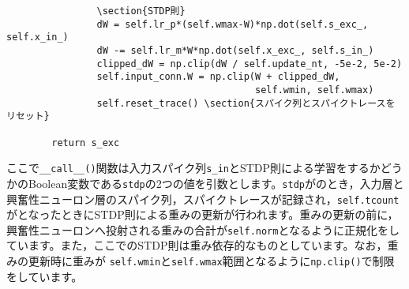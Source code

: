 \begin{verbatim}
                \section{STDP則}
                dW = self.lr_p*(self.wmax-W)*np.dot(self.s_exc_, self.x_in_)
                dW -= self.lr_m*W*np.dot(self.x_exc_, self.s_in_)
                clipped_dW = np.clip(dW / self.update_nt, -5e-2, 5e-2)
                self.input_conn.W = np.clip(W + clipped_dW,
                                            self.wmin, self.wmax)
                self.reset_trace() \section{スパイク列とスパイクトレースをリセット}
        
        return s_exc
\end{verbatim}
ここで\texttt{\_\_call\_\_()}関数は入力スパイク列\texttt{s\_in}とSTDP則による学習をするかどうかのBoolean変数である\texttt{stdp}の2つの値を引数とします。\texttt{stdp}がのとき，入力層と興奮性ニューロン層のスパイク列，スパイクトレースが記録され，\texttt{self.tcount}がとなったときにSTDP則による重みの更新が行われます。重みの更新の前に，興奮性ニューロンへ投射される重みの合計が\texttt{self.norm}となるように正規化をしています。また，ここでのSTDP則は重み依存的なものとしています。なお，重みの更新時に重みが
\texttt{self.wmin}と\texttt{self.wmax}範囲となるように\texttt{np.clip()}で制限をしています。
